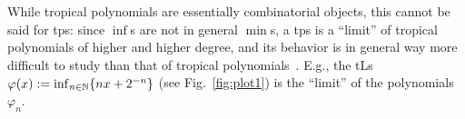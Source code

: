 While tropical polynomials are essentially combinatorial objects, this cannot be said for tps: since $\inf$s are not in general $\min$s, a tps is a ``limit'' of tropical polynomials of higher and higher degree, and its behavior is in general way more difficult to study than that of tropical polynomials~\cite{Porzio2021}. %
E.g., the tLs $\varphi(x):=\inf_{n\in\mathbb{N}}\{nx+2^{-n}\}$ (see Fig.~\ref{fig:plot1}) %
is the ``limit'' of the polynomials $\varphi_{n}$.

%
%



